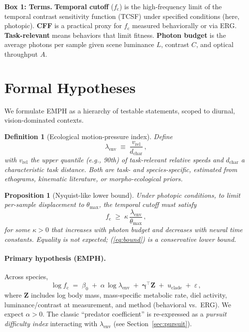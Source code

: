 \documentclass[11pt]{article}
\newtheorem{proposition}{Proposition}
\newtheorem{definitionenv}{Definition}
\newcommand{\fc}{f_{\mathrm{c}}}             %
\newcommand{\vrel}{v_{\mathrm{rel}}}          %
\newcommand{\dchar}{d_{\mathrm{char}}}        %
\newcommand{\lamenv}{\lambda_{\mathrm{env}}}  %
\newcommand{\thetamax}{\theta_{\max}}         %
\newcommand{\Lumin}{L}                        %
\newcommand{\Contrast}{C}                     %
\newcommand{\Aperture}{A}                     %
\begin{document}
\begin{graybox}
\textbf{Box 1: Terms.} \textbf{Temporal cutoff} ($\fc$) is the high-frequency limit of the temporal contrast sensitivity function (TCSF) under specified conditions (here, photopic). \textbf{CFF} is a practical proxy for $\fc$ measured behaviorally or via ERG. \textbf{Task-relevant} means behaviors that limit fitness. \textbf{Photon budget} is the average photons per sample given scene luminance $\Lumin$, contrast $\Contrast$, and optical throughput $\Aperture$.
\end{graybox}

\section{Formal Hypotheses}
We formulate EMPH as a hierarchy of testable statements, scoped to diurnal, vision-dominated contexts.

\begin{definitionenv}[Ecological motion-pressure index]
Define
\begin{equation}
\lamenv \;\equiv\; \frac{\vrel}{\dchar}\,,
\end{equation}
with $\vrel$ the upper quantile (e.g., 90th) of task-relevant relative speeds and $\dchar$ a characteristic task distance. Both are task- and species-specific, estimated from ethograms, kinematic literature, or morpho-ecological priors.
\end{definitionenv}

\begin{proposition}[Nyquist-like lower bound]
Under photopic conditions, to limit per-sample displacement to $\thetamax$, the temporal cutoff must satisfy
\begin{equation}
\label{eq:bound}
\fc \;\ge\; \kappa \,\frac{\lamenv}{\thetamax}\,,
\end{equation}
for some $\kappa>0$ that increases with photon budget and decreases with neural time constants. Equality is not expected; (\ref{eq:bound}) is a conservative lower bound.
\end{proposition}

\paragraph{Primary hypothesis (EMPH).}
Across species,
\begin{equation}
\label{eq:emph}
\log \fc \;=\; \beta_0 \;+\; \alpha\,\log \lamenv \;+\; \bm{\gamma}^{\top}\bm{Z}\;+\; u_{\text{clade}} \;+\; \varepsilon\,,
\end{equation}
where $\bm{Z}$ includes log body mass, mass-specific metabolic rate, diel activity, luminance/contrast at measurement, and method (behavioral vs.\ ERG). We expect $\alpha>0$. The classic ``predator coefficient'' is re-expressed as a \emph{pursuit difficulty index} interacting with $\lamenv$ (see Section~\ref{sec:pursuit}).
\end{document}
